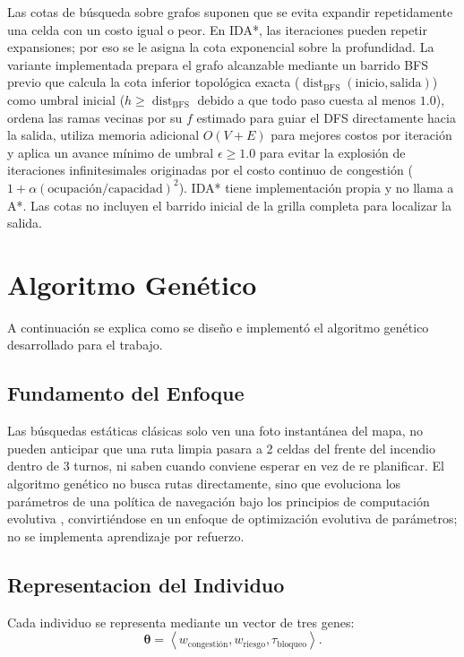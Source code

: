 \documentclass[11pt,letterpaper]{article}
\begin{document}
Las cotas de búsqueda sobre grafos suponen que se evita expandir repetidamente una celda con un costo igual o peor. En IDA*, las iteraciones pueden repetir expansiones; por eso se le asigna la cota exponencial sobre la profundidad. La variante implementada prepara el grafo alcanzable mediante un barrido BFS previo que calcula la cota inferior topológica exacta ($\operatorname{dist}_{\text{BFS}}(\text{inicio}, \text{salida})$) como umbral inicial ($h \ge \operatorname{dist}_{\text{BFS}}$ debido a que todo paso cuesta al menos $1.0$), ordena las ramas vecinas por su $f$ estimado para guiar el DFS directamente hacia la salida, utiliza memoria adicional $O(V+E)$ para mejores costos por iteración y aplica un avance mínimo de umbral $\epsilon \ge 1.0$ para evitar la explosión de iteraciones infinitesimales originadas por el costo continuo de congestión ($1 + \alpha(\text{ocupación}/\text{capacidad})^2$). IDA* tiene implementación propia y no llama a A*. Las cotas no incluyen el barrido inicial de la grilla completa para localizar la salida.

\newpage

\section{Algoritmo Genético}

A continuación se explica como se diseño e implementó el algoritmo genético desarrollado para el trabajo.

\subsection{Fundamento del Enfoque}

Las búsquedas estáticas clásicas solo ven una foto instantánea del mapa, no pueden anticipar que una ruta limpia pasara a 2 celdas del frente del incendio dentro de 3 turnos, ni saben cuando conviene esperar en vez de re planificar. El algoritmo genético no busca rutas directamente, sino que evoluciona los parámetros de una política de navegación bajo los principios de computación evolutiva \cite{goldberg1989, holland1992}, convirtiéndose en un enfoque de optimización evolutiva de parámetros; no se implementa aprendizaje por refuerzo.

\subsection{Representacion del Individuo}

Cada individuo se representa mediante un vector de tres genes:
\[
\boldsymbol{\theta}
=
\left\langle
w_{\text{congestión}},
w_{\text{riesgo}},
\tau_{\text{bloqueo}}
\right\rangle.
\]
\end{document}
